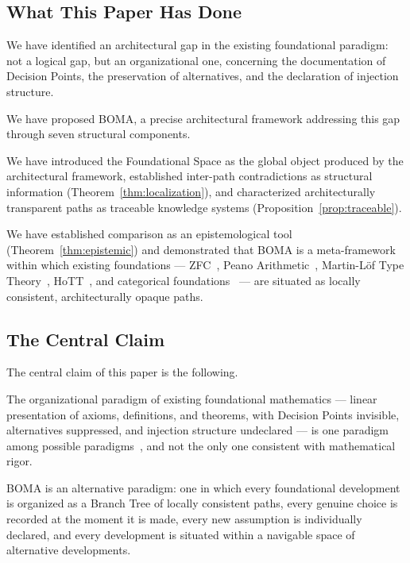 \documentclass[12pt, a4paper]{article}
\theoremstyle{plain}
\theoremstyle{definition}
\theoremstyle{remark}
\newcommand{\BOMA}{\textsf{BOMA}}
\begin{document}
\subsection{What This Paper Has Done}
\label{subsec:done}

We have identified an architectural gap in the existing foundational
paradigm: not a logical gap, but an organizational one, concerning the
documentation of Decision Points, the preservation of alternatives, and
the declaration of injection structure.

We have proposed \BOMA{}, a precise architectural framework addressing
this gap through seven structural components.

We have introduced the Foundational Space as the global object
produced by the architectural framework, established inter-path
contradictions as structural information (Theorem~\ref{thm:localization}),
and characterized architecturally transparent paths as traceable
knowledge systems (Proposition~\ref{prop:traceable}).

We have established comparison as an epistemological tool
(Theorem~\ref{thm:epistemic}) and demonstrated that \BOMA{} is a
meta-framework within which existing foundations --- ZFC~\cite{Jech2003,Zermelo1908},
Peano Arithmetic~\cite{Peano1889}, Martin-L\"{o}f Type Theory~\cite{MartinLof1975,MartinLof1984},
HoTT~\cite{HoTTBook2013}, and categorical foundations~\cite{Lawvere1964,MacLane1971} ---
are situated as locally consistent, architecturally opaque paths.

\subsection{The Central Claim}
\label{subsec:central}

The central claim of this paper is the following.

The organizational paradigm of existing foundational mathematics ---
linear presentation of axioms, definitions, and theorems, with
Decision Points invisible, alternatives suppressed, and injection
structure undeclared --- is one paradigm among possible
paradigms~\cite{BenacerrafPutnam1983,Shapiro2000}, and not the only one
consistent with mathematical rigor.

\BOMA{} is an alternative paradigm: one in which every foundational
development is organized as a Branch Tree of locally consistent paths,
every genuine choice is recorded at the moment it is made, every new
assumption is individually declared, and every development is situated
within a navigable space of alternative developments.
\end{document}

